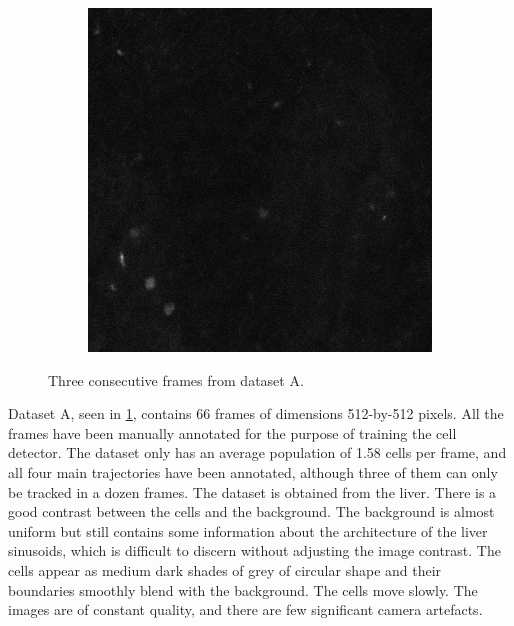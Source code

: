 \begin{figure}[h]
\begin{subfigure}{.32\textwidth}
   		\end{subfigure}
   		\hfill
   		\begin{subfigure}{.32\textwidth}
   		\includegraphics[width=\textwidth]{images/series30green021}
   		\end{subfigure}
   		\caption{Three consecutive frames from dataset A.}
   		\label{fig:data_datasetA}
   	\end{figure}
   	  	
   	Dataset A, seen in \cref{fig:data_datasetA}, contains 66 frames of dimensions 512-by-512 pixels. All the frames have been manually annotated for the purpose of training the cell detector. The dataset only has an average population of 1.58 cells per frame, and all four main trajectories have been annotated, although three of them can only be tracked in a dozen frames. The dataset is obtained from the liver. There is a good contrast between the cells and the background. The background is almost uniform but still contains some information about the architecture of the liver sinusoids, which is difficult to discern without adjusting the image contrast. The cells appear as medium dark shades of grey of circular shape and their boundaries smoothly blend with the background. The cells move slowly. The images are of constant quality, and there are few significant camera artefacts.
   	
